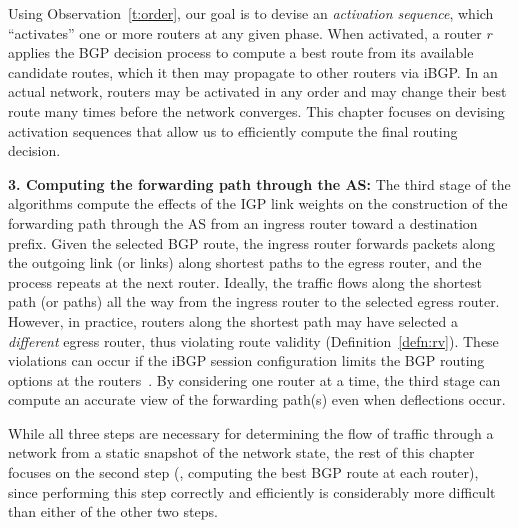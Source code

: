 Using Observation~\ref{t:order}, our goal is to devise an {\em
activation sequence\/}, which ``activates'' one or more routers at any
given phase.  When activated, a router $r$ applies the BGP decision
process to compute a best route from its available candidate routes,
which it then may propagate to other routers via iBGP.  In an actual
network, routers may be activated in any order and may change their best
route many times before the network converges.  This chapter focuses on
devising activation sequences that allow us to efficiently compute
the final routing decision.


\textbf{3. Computing the forwarding path through the AS:} The third
stage of the algorithms compute the effects of the IGP link weights on
the construction of the forwarding path through the AS from an ingress
router toward a destination prefix.  Given the selected BGP route, the
ingress router forwards packets along the outgoing link (or links) along
shortest paths to the egress router, and the process repeats at the next
router.  Ideally, the traffic flows along the shortest path (or paths)
all the way from the ingress router to the selected egress router.
However, in practice, routers along the shortest path may have selected a
{\em different} egress router, thus violating route validity
(Definition~\ref{defn:rv}).  These 
violations can occur if the iBGP session configuration limits the
BGP routing options at the routers~\cite{Griffin2002}.  By considering
one router at a time, the third stage can compute an accurate view of
the forwarding path(s) even when deflections occur.

While all three steps are necessary for determining the flow of traffic
through a network from a static snapshot of the network state, the rest
of this chapter focuses on the second step (\ie, computing the best BGP
route at each router), since performing this step correctly and
efficiently is considerably more difficult than either of the other two
steps.
